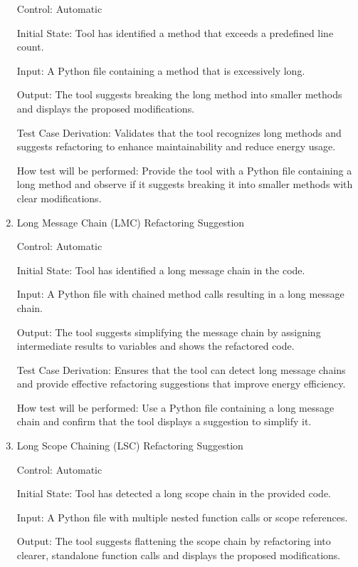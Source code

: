 \documentclass[12pt, titlepage]{article}
\begin{document}
\begin{enumerate}
  Control: Automatic
            
  Initial State: Tool has identified a method that exceeds a predefined line count.
            
  Input: A Python file containing a method that is excessively long.
            
  Output: The tool suggests breaking the long method into smaller methods and displays the proposed modifications.
  
  Test Case Derivation: Validates that the tool recognizes long methods and suggests refactoring to enhance maintainability and reduce energy usage.
            
  How test will be performed: Provide the tool with a Python file containing a long method and observe if it suggests breaking it into smaller methods with clear modifications.
  
  \item{Long Message Chain (LMC) Refactoring Suggestion\\}
  
  Control: Automatic
            
  Initial State: Tool has identified a long message chain in the code.
            
  Input: A Python file with chained method calls resulting in a long message chain.
            
  Output: The tool suggests simplifying the message chain by assigning intermediate results to variables and shows the refactored code.
  
  Test Case Derivation: Ensures that the tool can detect long message chains and provide effective refactoring suggestions that improve energy efficiency.
            
  How test will be performed: Use a Python file containing a long message chain and confirm that the tool displays a suggestion to simplify it.
  
  \item{Long Scope Chaining (LSC) Refactoring Suggestion\\}
  
  Control: Automatic
            
  Initial State: Tool has detected a long scope chain in the provided code.
            
  Input: A Python file with multiple nested function calls or scope references.
            
  Output: The tool suggests flattening the scope chain by refactoring into clearer, standalone function calls and displays the proposed modifications.
  

\end{enumerate}
\end{document}
